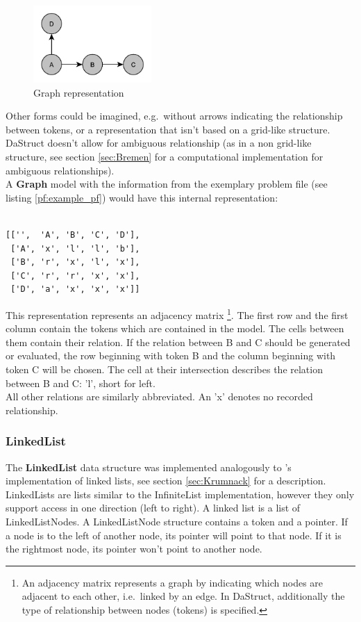\documentclass[hidelinks]{scrartcl}
\begin{document}
\begin{figure}[H]
	\caption{Graph representation}
	\label{img:graph_example_pf}
	\centering
	\includegraphics[width=0.4\textwidth]{Illustrations/Graph.pdf}
\end{figure}

Other forms could be imagined, e.g.\ without arrows indicating the relationship between tokens, or a representation that isn't based on a grid-like structure. DaStruct doesn't allow for ambiguous relationship (as in a non grid-like structure, see section \ref{sec:Bremen} for a computational implementation for ambiguous relationships).\\

A \textbf{Graph} model with the information from the exemplary problem file (see listing \ref{pf:example_pf}) would have this internal representation: \\ \\

\begin{lstlisting}[caption=Graph representation, label=graph_example_pf, frame=single]
[['',  'A', 'B', 'C', 'D'],
 ['A', 'x', 'l', 'l', 'b'],
 ['B', 'r', 'x', 'l', 'x'],
 ['C', 'r', 'r', 'x', 'x'],
 ['D', 'a', 'x', 'x', 'x']]
\end{lstlisting}

This representation represents an adjacency matrix \footnote{An adjacency matrix represents a graph by indicating which nodes are adjacent to each other, i.e.\ linked by an edge. In DaStruct, additionally the type of relationship between nodes (tokens) is specified.}. The first row and the first column contain the tokens which are contained in the model. The cells between them contain their relation. If the relation between B and C should be generated or evaluated, the row beginning with token B and the column beginning with token C will be chosen. The cell at their intersection describes the relation between B and C: 'l', short for left. \\
All other relations are similarly abbreviated. An 'x' denotes no recorded relationship.

\subsubsection{LinkedList}
The \textbf{LinkedList} data structure was implemented analogously to \cite{Krumnack.2011}'s implementation of linked lists, see section \ref{sec:Krumnack} for a description. LinkedLists are lists similar to the InfiniteList implementation, however they only support access in one direction (left to right). A linked list is a list of LinkedListNodes.
A LinkedListNode structure contains a token and a pointer. If a node is to the left of another node, its pointer will point to that node. If it is the rightmost node, its pointer won't point to another node. \\
\end{document}
